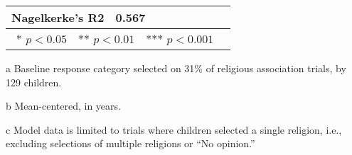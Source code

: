 \begin{table}[ht]
\begin{threeparttable}
\begin{tabular}{lllllllll}
\textbf{Nagelkerke's R2} & 0.567  &  &  &  &  &  &  \\
\bottomrule
\multicolumn{8}{r}{* $p<0.05$~~** $p<0.01$~~*** $p<0.001$}\\
\end{tabular}
\begin{tablenotes}[flushleft]
    \item[a] Baseline response category selected on 31\% of religious association trials, by 129 children. %
    \item[b] Mean-centered, in years.
    \item[c] Model data is limited to trials where children selected a single religion, i.e., excluding selections of multiple religions or ``No opinion.'' 
\end{tablenotes}
\end{threeparttable}
\end{table}
